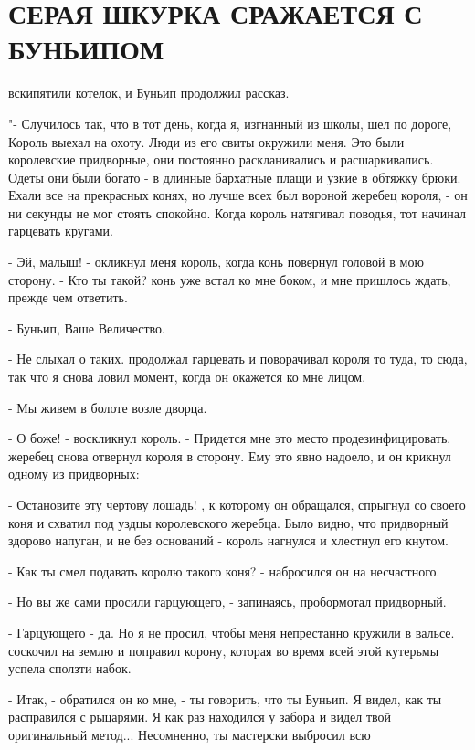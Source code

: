 \chapter{СЕРАЯ ШКУРКА СРАЖАЕТСЯ С БУНЬИПОМ}
\par{} вскипятили котелок, и Буньип продолжил рассказ.
\par"- Случилось так, что в тот день, когда я, изгнанный из школы, шел 
по дороге, Король выехал на охоту. Люди из его свиты окружили меня. 
Это были королевские придворные, они постоянно раскланивались и 
расшаркивались. Одеты они были богато - в длинные бархатные плащи и 
узкие в обтяжку брюки. Ехали все на прекрасных конях, но лучше всех 
был вороной жеребец короля, - он ни секунды не мог стоять спокойно. 
Когда король натягивал поводья, тот начинал гарцевать кругами.
\par- Эй, малыш! - окликнул меня король, когда конь повернул головой в 
мою сторону. - Кто ты такой?
 конь уже встал ко мне боком, и мне пришлось ждать, прежде чем 
ответить.
\par- Буньип, Ваше Величество.
\par- Не слыхал о таких.
 продолжал гарцевать и поворачивал короля то туда, то сюда, 
так что я снова ловил момент, когда он окажется ко мне лицом.
\par- Мы живем в болоте возле дворца.
\par- О боже! - воскликнул король. - Придется мне это место 
продезинфицировать.
 жеребец снова отвернул короля в сторону. Ему это явно надоело, 
и он крикнул одному из придворных:
\par- Остановите эту чертову лошадь!
, к которому он обращался, спрыгнул со своего коня и 
схватил под уздцы королевского жеребца. Было видно, что придворный 
здорово напуган, и не без оснований - король нагнулся и хлестнул его 
кнутом.
\par- Как ты смел подавать королю такого коня? - набросился он на 
несчастного.
\par- Но вы же сами просили гарцующего, - запинаясь, пробормотал 
придворный.
\par- Гарцующего - да. Но я не просил, чтобы меня непрестанно кружили 
в вальсе.
 соскочил на землю и поправил корону, которая во время всей 
этой кутерьмы успела сползти набок.
\par- Итак, - обратился он ко мне, - ты говорить, что ты Буньип. Я 
видел, как ты расправился с рыцарями. Я как раз находился у забора и 
видел твой оригинальный метод... Несомненно, ты мастерски выбросил всю 
